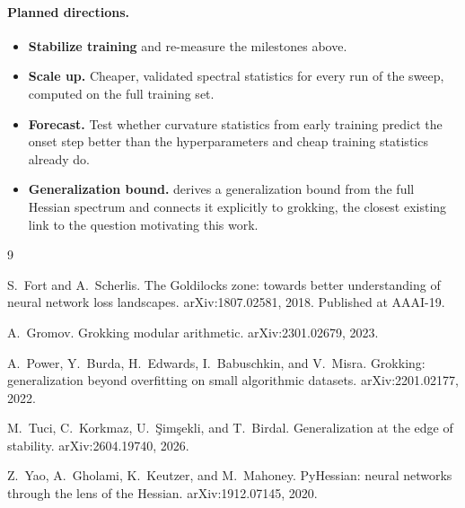 \documentclass[11pt,a4paper]{article}
\begin{document}
\paragraph{Planned directions.}
\begin{itemize}[leftmargin=*,itemsep=2pt]
    \item \textbf{Stabilize training} and re-measure the milestones above.
    \item \textbf{Scale up.} Cheaper, validated spectral statistics for every
    run of the sweep, computed on the full training set.
    \item \textbf{Forecast.} Test whether curvature statistics from early
    training predict the onset step better than the hyperparameters and cheap
    training statistics already do.
    \item \textbf{Generalization bound.} \citet{tuci2026generalization}
    derives a generalization bound from the full Hessian spectrum and
    connects it explicitly to grokking, the closest existing link to the
    question motivating this work.
\end{itemize}

{\footnotesize
\setlength{\bibsep}{1pt plus 0.3ex}
\begin{thebibliography}{9}
\setlength{\itemsep}{0pt}
\setlength{\parskip}{0pt}

S.~Fort and A.~Scherlis.
\newblock The Goldilocks zone: towards better understanding of neural network
loss landscapes.
\newblock arXiv:1807.02581, 2018. Published at AAAI-19.

A.~Gromov.
\newblock Grokking modular arithmetic.
\newblock arXiv:2301.02679, 2023.

A.~Power, Y.~Burda, H.~Edwards, I.~Babuschkin, and V.~Misra.
\newblock Grokking: generalization beyond overfitting on small algorithmic
datasets.
\newblock arXiv:2201.02177, 2022.

M.~Tuci, C.~Korkmaz, U.~\c{S}im\c{s}ekli, and T.~Birdal.
\newblock Generalization at the edge of stability.
\newblock arXiv:2604.19740, 2026.

Z.~Yao, A.~Gholami, K.~Keutzer, and M.~Mahoney.
\newblock PyHessian: neural networks through the lens of the Hessian.
\newblock arXiv:1912.07145, 2020.
\end{thebibliography}
}
\end{document}
